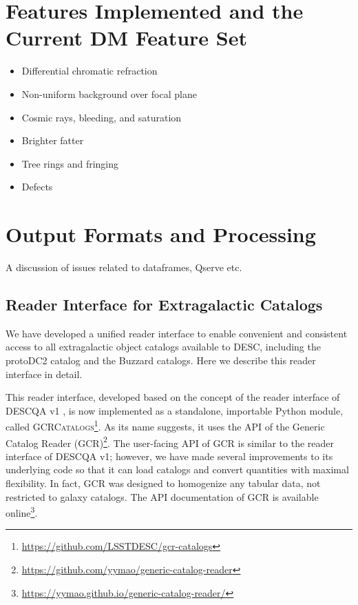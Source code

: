 \documentclass[preprint,times]{aastex61}
\begin{document}
\section{Features Implemented and the Current DM Feature Set}

\begin{itemize}
\item Differential chromatic refraction
\item Non-uniform background over focal plane
\item Cosmic rays, bleeding, and saturation
\item Brighter fatter
\item Tree rings and fringing
\item Defects
\end{itemize}

\section{Output Formats and Processing}
\label{sec:output}

A discussion of issues related to dataframes, Qserve etc.

\subsection{Reader Interface for Extragalactic Catalogs}
\label{sec:gcr}

We have developed a unified reader interface to enable convenient and consistent access to all extragalactic object catalogs available to DESC, including the protoDC2 catalog and the Buzzard catalogs. Here we describe this reader interface in detail.

This reader interface, developed based on the concept of the reader interface of DESCQA v1 \citep{descqa}, is now implemented as a standalone, importable Python module, called \textsc{GCRCatalogs}\footnote{\url{https://github.com/LSSTDESC/gcr-catalogs}}.
As its name suggests, it uses the API of the Generic Catalog Reader (\textsc{GCR})\footnote{\url{https://github.com/yymao/generic-catalog-reader}}. 
The user-facing API of \textsc{GCR} is similar to the reader interface of DESCQA v1; however, we have made several improvements to its underlying code so that it can load catalogs and convert quantities with maximal flexibility. In fact, \textsc{GCR} was designed to homogenize any tabular data, not restricted to galaxy catalogs. The API documentation of \textsc{GCR} is available online\footnote{\url{https://yymao.github.io/generic-catalog-reader/}}. 
\end{document}

